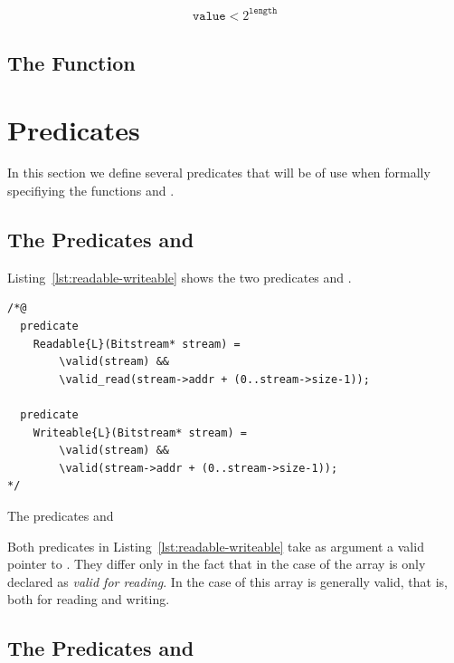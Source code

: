 \begin{align}
\label{eq:bit-stream-write-pre}
    \mathtt{value} < 2^{\mathtt{length}}
\end{align}

\subsection{The Function }


\section{Predicates}

In this section we define several \acsl predicates that will be of use when
formally specifiying the functions \bitstreamread and \bitstreamwrite.


\subsection{The Predicates \readable and \writeable}

Listing~\ref{lst:readable-writeable} shows the two predicates \readable and \writeable.

\begin{listing}[hbt]
\begin{lstlisting}[style=acsl-block]
/*@
  predicate 
    Readable{L}(Bitstream* stream) =
        \valid(stream) &&
        \valid_read(stream->addr + (0..stream->size-1));

  predicate
    Writeable{L}(Bitstream* stream) =
        \valid(stream) &&
        \valid(stream->addr + (0..stream->size-1));
*/
\end{lstlisting}
\caption{\label{lst:readable-writeable} The predicates \readable and \writeable}
\end{listing}

Both predicates in Listing~\ref{lst:readable-writeable}
take as argument a valid pointer to \bitstream.
They differ only in the fact that in the case of \readable
the array  is only declared as \emph{valid for reading}.
In the case of \writeable this array is generally valid, that is, both for reading and writing.

\subsection{The Predicates \invariant and \normal}
